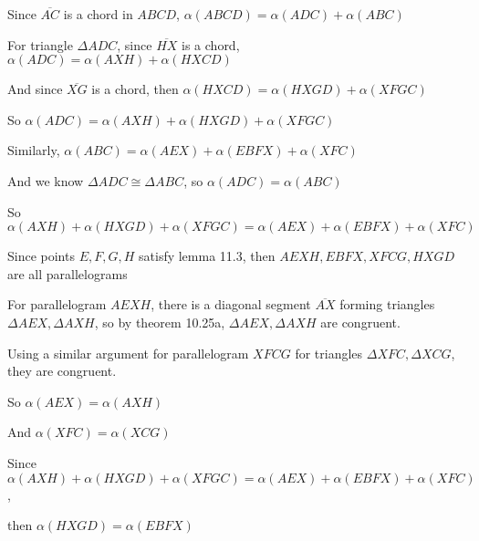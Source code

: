 \documentclass[11pt]{article}
\newcommand{\segment}[1]{\overline{#1}}
\begin{document}
\begin{itemize}
		Since $\segment{AC}$ is a chord in $ABCD$, $\alpha(ABCD) = \alpha(ADC) + \alpha(ABC)$

		For triangle $\Delta ADC$, since $\segment{HX}$ is a chord, $\alpha(ADC) = \alpha(AXH) + \alpha(HXCD)$

		And since $\segment{XG}$ is a chord, then $\alpha(HXCD) = \alpha(HXGD) + \alpha(XFGC)$

		So $\alpha(ADC) = \alpha(AXH) + \alpha(HXGD) + \alpha(XFGC)$

		Similarly, $\alpha(ABC) = \alpha(AEX) + \alpha(EBFX) + \alpha(XFC)$

		And we know $\Delta ADC \cong \Delta ABC$, so $\alpha(ADC) = \alpha(ABC)$

		So $\alpha(AXH) + \alpha(HXGD) + \alpha(XFGC) = \alpha(AEX) + \alpha(EBFX) + \alpha(XFC)$

		Since points $E,F,G,H$ satisfy lemma 11.3, then $AEXH, EBFX, XFCG, HXGD$ are all parallelograms

		For parallelogram $AEXH$, there is a diagonal segment $\segment{AX}$ forming triangles $\Delta AEX, \Delta AXH$, so by theorem 10.25a, $\Delta AEX, \Delta AXH$ are congruent.

		Using a similar argument for parallelogram $XFCG$ for triangles $\Delta XFC, \Delta XCG$, they are congruent.

		So $\alpha(AEX) = \alpha(AXH)$

		And $\alpha(XFC) = \alpha(XCG)$

		Since $\alpha(AXH) + \alpha(HXGD) + \alpha(XFGC) = \alpha(AEX) + \alpha(EBFX) + \alpha(XFC)$,

		then $\alpha(HXGD) = \alpha(EBFX)$
\end{itemize}
\end{document}
